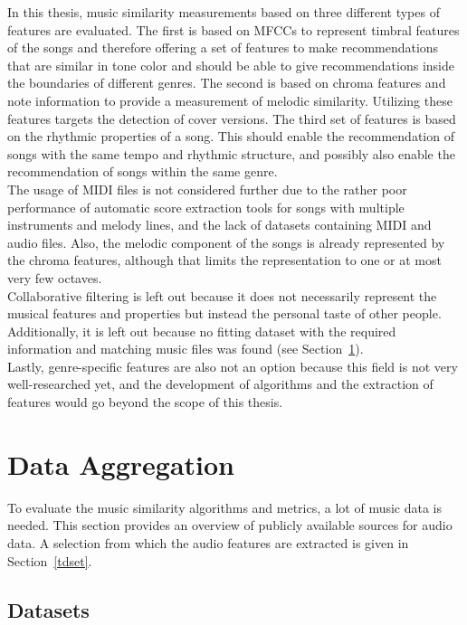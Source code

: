 In this thesis, music similarity measurements based on three different types of features are evaluated. The first is based on MFCCs to represent timbral features of the songs and therefore offering a set of features to make recommendations that are similar in tone color and should be able to give recommendations inside the boundaries of different genres. The second is based on chroma features and note information to provide a measurement of melodic similarity. Utilizing these features targets the detection of cover versions. The third set of features is based on the rhythmic properties of a song. This should enable the recommendation of songs with the same tempo and rhythmic structure, and possibly also enable the recommendation of songs within the same genre.\\
The usage of MIDI files is not considered further due to the rather poor performance of automatic score extraction tools for songs with multiple instruments and melody lines, and the lack of datasets containing MIDI and audio files. Also, the melodic component of the songs is already represented by the chroma features, although that limits the representation to one or at most very few octaves.\\
Collaborative filtering is left out because it does not necessarily represent the musical features and properties but instead the personal taste of other people. Additionally, it is left out because no fitting dataset with the required information and matching music files was found (see Section~\ref{data}).\\
Lastly, genre-specific features are also not an option because this field is not very well-researched yet, and the development of algorithms and the extraction of features would go beyond the scope of this thesis.

\section{Data Aggregation}\label{data}

To evaluate the music similarity algorithms and metrics, a lot of music data is needed. This section provides an overview of publicly available sources for audio data. A selection from which the audio features are extracted is given in Section~\ref{tdset}.

\subsection{Datasets}\label{datasets}

